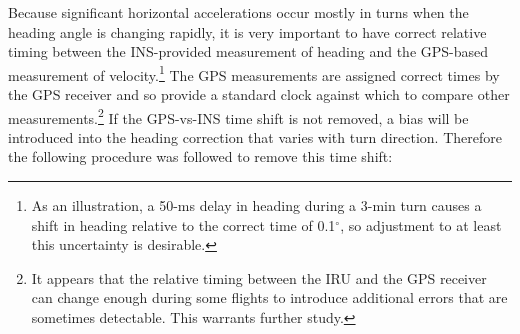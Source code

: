 \documentclass[12pt,twoside,english,12pt,twoside,english]{article}\usepackage[]{graphicx}\usepackage[]{color}
\let\OrgIndex\index
\renewcommand*{\index}[1]{\OrgIndex{#1}}
\begin{document}
Because significant horizontal accelerations
occur mostly in turns when the heading angle is changing rapidly,
it is very important to have correct relative timing
between the INS-provided measurement
of heading and the GPS-based measurement
of velocity.\footnote{As an illustration, a 50-ms delay in heading during
a 3-min turn causes a shift in heading relative to the correct time
of 0.1$^{\circ}$, so adjustment to at least this uncertainty is desirable. } The GPS measurements are assigned correct
times by the GPS receiver and so provide a standard clock against
which to compare other measurements.\footnote{It appears that the relative timing between the IRU and the GPS
receiver can change enough during some flights to introduce additional
errors that are sometimes detectable. This warrants
further study.} If the GPS-vs-INS time shift
is not removed, a bias will be introduced into the heading correction
that varies with turn direction. Therefore the following procedure
was followed to remove this time shift:
\end{document}
